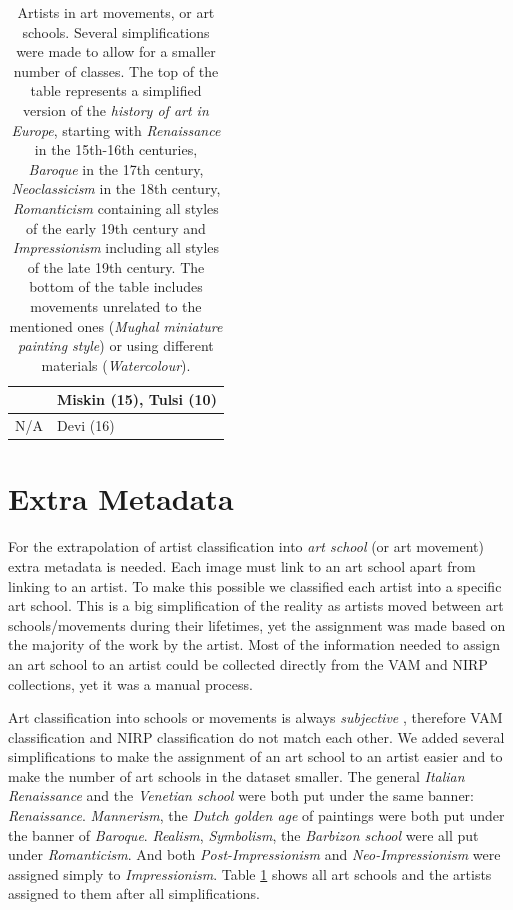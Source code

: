 \documentclass[11pt,a4paper,twoside,openright,draft]{report}
\begin{document}
\begin{multicols}{2}
\begin{table}[htp]
\begin{tabular}{|l|l|}
                     &  Miskin (15), Tulsi (10)                         \\
\midrule
N/A                  &  Devi (16) \\
\bottomrule
\end{tabular}
\caption[Artists in art movements]{Artists in art movements, or art schools.
Several simplifications were made to allow for a smaller number of classes.
The top of the table represents a simplified version of the \emph{history of
art in Europe}, starting with \emph{Renaissance} in the 15th-16th centuries,
\emph{Baroque} in the 17th century, \emph{Neoclassicism} in the 18th century,
\emph{Romanticism} containing all styles of the early 19th century and
\emph{Impressionism} including all styles of the late 19th century.  The bottom
of the table includes movements unrelated to the mentioned ones (\emph{Mughal
miniature painting style}) or using different materials (\emph{Watercolour}).}
\label{tab:style}
\end{table}

\section{Extra Metadata}

For the extrapolation of artist classification into \emph{art school} (or art
movement) extra metadata is needed.  Each image must link to an art school
apart from linking to an artist.  To make this possible we classified each
artist into a specific art school.  This is a big simplification of the reality
as artists moved between art schools/movements during their lifetimes, yet the
assignment was made based on the majority of the work by the artist.  Most of
the information needed to assign an art school to an artist could be collected
directly from the VAM and NIRP collections, yet it was a manual process.

Art classification into schools or movements is always \emph{subjective}
\cite{dimaggio87art}, therefore VAM classification and NIRP classification do
not match each other.  We added several simplifications to make the assignment
of an art school to an artist easier and to make the number of art schools in
the dataset smaller.  The general \emph{Italian Renaissance} and the
\emph{Venetian school} were both put under the same banner: \emph{Renaissance}.
\emph{Mannerism}, the \emph{Dutch golden age} of paintings were both put under
the banner of \emph{Baroque}.  \emph{Realism}, \emph{Symbolism}, the
\emph{Barbizon school} were all put under \emph{Romanticism}.  And both
\emph{Post-Impressionism} and \emph{Neo-Impressionism} were assigned simply to
\emph{Impressionism}.  Table \ref{tab:style} shows all art schools and the
artists assigned to them after all simplifications.


\end{multicols}
\end{document}

